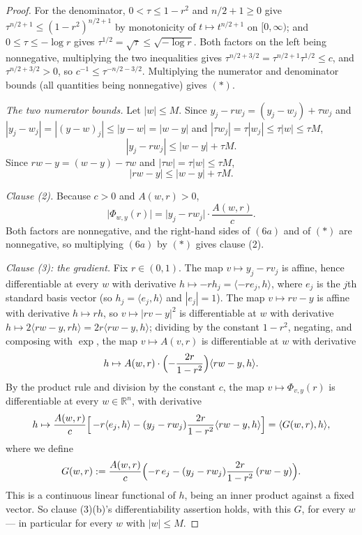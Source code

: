 \begin{proof}
For the denominator, $0 < \tau \leq 1-r^2$ and $n/2+1 \geq 0$ give
$\tau^{n/2+1} \leq (1-r^2)^{n/2+1}$ by monotonicity of $t \mapsto t^{n/2+1}$ on
$[0,\infty)$; and $0 \leq \tau \leq -\log r$ gives
$\tau^{1/2} = \sqrt\tau \leq \sqrt{-\log r}$.  Both factors on the left being
nonnegative, multiplying the two inequalities gives
$\tau^{n/2+3/2} = \tau^{n/2+1}\tau^{1/2} \leq c$, and $\tau^{n/2+3/2} > 0$, so
$c^{-1} \leq \tau^{-n/2-3/2}$.  Multiplying the numerator and denominator
bounds (all quantities being nonnegative) gives $(\ast)$.

\emph{The two numerator bounds.}  Let $|w| \leq M$.  Since
$y_j - r w_j = (y_j - w_j) + \tau w_j$ and $|y_j - w_j| = |(y-w)_j| \leq |y-w|
= |w-y|$ and $|\tau w_j| = \tau|w_j| \leq \tau|w| \leq \tau M$,
\[
  |y_j - r w_j| \leq |w-y| + \tau M . \tag{6a}
\]
Since $rw - y = (w-y) - \tau w$ and $|\tau w| = \tau|w| \leq \tau M$,
\[
  |rw - y| \leq |w-y| + \tau M . \tag{6b}
\]

\emph{Clause (2).}  Because $c > 0$ and $A(w,r) > 0$,
\[
  \bigl|\Phi_{w,y}(r)\bigr|
    = \bigl|y_j - r w_j\bigr|\cdot\frac{A(w,r)}{c} .
\]
Both factors are nonnegative, and the right-hand sides of $(6a)$ and of
$(\ast)$ are nonnegative, so multiplying $(6a)$ by $(\ast)$ gives clause (2).

\emph{Clause (3): the gradient.}  Fix $r \in (0,1)$.  The map
$v \mapsto y_j - r v_j$ is affine, hence differentiable at every $w$ with
derivative $h \mapsto -r h_j = \langle -r e_j, h\rangle$, where $e_j$ is the
$j$th standard basis vector (so $h_j = \langle e_j,h\rangle$ and $|e_j| = 1$).
The map $v \mapsto rv - y$ is affine with derivative $h \mapsto rh$, so
$v \mapsto |rv-y|^2$ is differentiable at $w$ with derivative
$h \mapsto 2\langle rw-y, rh\rangle = 2r\langle rw-y,h\rangle$; dividing by the
constant $1-r^2$, negating, and composing with $\exp$, the map
$v \mapsto A(v,r)$ is differentiable at $w$ with derivative
\[
  h \mapsto A(w,r)\cdot\Bigl(-\frac{2r}{1-r^2}\Bigr)\langle rw-y,h\rangle .
\]
By the product rule and division by the constant $c$, the map
$v \mapsto \Phi_{v,y}(r)$ is differentiable at every $w \in \mathbb{R}^n$, with
derivative
\[
  h \mapsto \frac{A(w,r)}{c}
    \Bigl[\,-r\langle e_j,h\rangle
      - (y_j - r w_j)\frac{2r}{1-r^2}\langle rw-y,h\rangle\Bigr]
  = \langle G(w,r), h\rangle ,
\]
where we define
\[
  G(w,r) := \frac{A(w,r)}{c}
    \Bigl(-r\,e_j - (y_j - r w_j)\frac{2r}{1-r^2}\,(rw-y)\Bigr) .
\]
This is a continuous linear functional of $h$, being an inner product against a
fixed vector.  So clause (3)(b)'s differentiability assertion holds, with this
$G$, for every $w$ --- in particular for every $w$ with $|w| \leq M$.


\end{proof}
